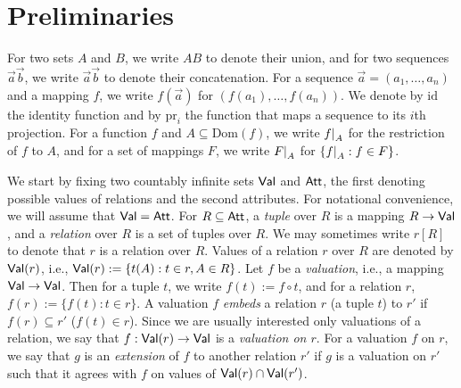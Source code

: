 \documentclass[envcountset]{llncs}
\newcommand{\problemFont}[1]{\protect\ensuremath{\mathsf{#1}}}
\newcommand{\sub}{\subseteq}
\newcommand{\pr}{\mathrm{pr}}
\newcommand{\tuple}[1]{\vec{#1}}
\newcommand{\Dom}{\textrm{Dom}}
\newcommand{\at}{\problemFont{Att}}
\newcommand\re[2]{{\left.\kern-\nulldelimiterspace #1 \vphantom{|} \right|_{#2} }}
\newcommand{\Val}{\problemFont{Val}}
\newcommand{\id}{\mathrm{id}}
\begin{document}
\section{Preliminaries}
For two sets $A$ and $B$, we write $AB$ to denote their union, and for two sequences $\tuple a \tuple b$, we write $\tuple a \tuple b$ to denote their concatenation. For a sequence $\tuple a =(a_1, \ldots ,a_n)$ and a mapping $f$, we write $f(\tuple a)$ for $(f(a_1),\ldots ,f(a_n))$. We denote by $\id$ the identity function and by $\pr_i$ the function that maps a sequence to its $i$th projection. 
For a function $f$ and $A\sub \Dom(f)$, we write $\re{f}{A}$ for the restriction of $f$ to $A$, and for a set of mappings $F$, we write $\re{F}{A}$ for $\{\re{f}{A}: f\in F\}$.

We start by fixing two countably infinite sets $\Val$ and $\at$, the first denoting possible values of relations and the second  attributes. For notational convenience, we will assume that $\Val= \at$. For $R\sub \at$, a \emph{tuple} over $R$ is a  mapping $R \to \Val$, and a \emph{relation} over $R$ is a set of tuples over $R$. We may sometimes write $r[R]$ to denote that $r$ is a relation over $R$. Values of a relation $r$ over $ R$ are denoted by $\Val(r)$, i.e., $\Val(r):=\{t(A):t\in r,A\in R\}$. Let $f$ be a \emph{valuation}, i.e., a mapping $\Val \to \Val$. Then for a tuple $t$, we write $f(t):=f\circ t$, and for a relation $r$, $f(r) :=\{f( t) :t\in r\}$. A valuation $f$ \emph{embeds}  a relation $r$ (a tuple $t$) to $r'$ if $f(r) \sub r'$ ($f(t)\in r$). Since we are usually interested only valuations of a relation, we say that $f: \Val(r)\to \Val$ is a \emph{valuation on $r$}. For a valuation $f$ on $r$, we say that $g$ is an \emph{extension} of $f$ to another relation $r'$ if $g$ is a valuation on $r'$ such that it agrees with $f$ on values of $\Val(r)\cap\Val(r')$.
\end{document}
